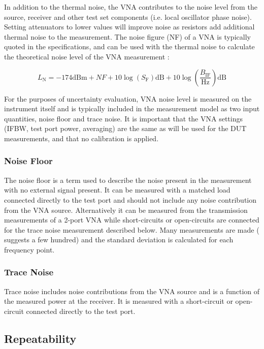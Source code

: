 \documentclass[../thesis/thesis.tex]{subfiles}
\begin{document}
\begin{refsection}
In addition to the thermal noise, the VNA contributes to the noise level from the source, receiver and other test set components (i.e. local oscillator phase noise). Setting attenuators to lower values will improve noise as resistors add additional thermal noise to the measurement. The noise figure (NF) of a VNA is typically quoted in the specifications, and can be used with the thermal noise to calculate the theoretical noise level of the VNA measurement \cite{Hiebel_2008}:

\begin{equation}
	L_\textrm{N} = -174 \textrm{dBm} + NF + 10\log(S_\textrm{F})\textrm{dB} + 10\log\left(\frac{B_\textrm{IF}}{\textrm{Hz}}\right)\textrm{dB}
\end{equation}

For the purposes of uncertainty evaluation, VNA noise level is measured on the instrument itself and is typically included in the measurement model as two input quantities, noise floor and trace noise. It is important that the VNA settings (IFBW, test port power, averaging) are the same as will be used for the DUT measurements, and that no calibration is applied.

\subsubsection{Noise Floor}

The noise floor is a term used to describe the noise present in the measurement with no external signal present. It can be measured with a matched load connected directly to the test port and should not include any noise contribution from the VNA source. Alternatively it can be measured from the transmission measurements of a 2-port VNA while short-circuits or open-circuits are connected for the trace noise measurement described below. Many measurements are made (\cite{EURAMET_2011} suggests a few hundred) and the standard deviation is calculated for each frequency point.

\subsubsection{Trace Noise}

Trace noise includes noise contributions from the VNA source and is a function of the measured power at the receiver. It is measured with a short-circuit or open-circuit connected directly to the test port.

\subsection{Repeatability}


\end{refsection}
\end{document}
